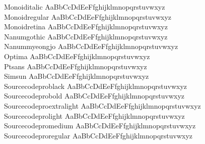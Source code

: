 \begin{tabbing}
Monoiditalic \> { AaBbCcDdEeFfghijklmnopqrstuvwxyz} \\
Monoidregular \> { AaBbCcDdEeFfghijklmnopqrstuvwxyz} \\
Monoidretina \> { AaBbCcDdEeFfghijklmnopqrstuvwxyz} \\
Nanumgothic \> { AaBbCcDdEeFfghijklmnopqrstuvwxyz} \\
Nanummyeongjo \> { AaBbCcDdEeFfghijklmnopqrstuvwxyz} \\
Optima \> { AaBbCcDdEeFfghijklmnopqrstuvwxyz} \\
Ptsans \> { AaBbCcDdEeFfghijklmnopqrstuvwxyz} \\
Simsun \> { AaBbCcDdEeFfghijklmnopqrstuvwxyz} \\
Sourcecodeproblack \> { AaBbCcDdEeFfghijklmnopqrstuvwxyz} \\
Sourcecodeprobold \> { AaBbCcDdEeFfghijklmnopqrstuvwxyz} \\
Sourcecodeproextralight \> { AaBbCcDdEeFfghijklmnopqrstuvwxyz} \\
Sourcecodeprolight \> { AaBbCcDdEeFfghijklmnopqrstuvwxyz} \\
Sourcecodepromedium \> { AaBbCcDdEeFfghijklmnopqrstuvwxyz} \\
Sourcecodeproregular \> { AaBbCcDdEeFfghijklmnopqrstuvwxyz} \\

\end{tabbing}
